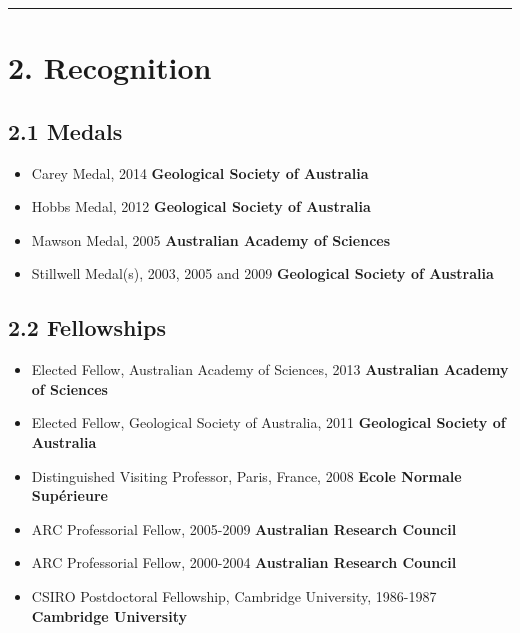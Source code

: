 \documentclass[
]{article}
\providecommand{\tightlist}{%
  \setlength{\itemsep}{0pt}\setlength{\parskip}{0pt}}
\begin{document}
\begin{center}\rule{0.5\linewidth}{0.5pt}\end{center}

\hypertarget{recognition}{%
\section{2. Recognition}\label{recognition}}

\hypertarget{medals}{%
\subsection{2.1 Medals}\label{medals}}

\begin{itemize}
\tightlist
\item
  Carey Medal, 2014 \textbf{Geological Society of Australia}\\
\item
  Hobbs Medal, 2012 \textbf{Geological Society of Australia}\\
\item
  Mawson Medal, 2005 \textbf{Australian Academy of Sciences}
\item
  Stillwell Medal(s), 2003, 2005 and 2009 \textbf{Geological Society of
  Australia}
\end{itemize}

\hypertarget{fellowships}{%
\subsection{2.2 Fellowships}\label{fellowships}}

\begin{itemize}
\tightlist
\item
  Elected Fellow, Australian Academy of Sciences, 2013
  \textbf{Australian Academy of Sciences}
\item
  Elected Fellow, Geological Society of Australia, 2011
  \textbf{Geological Society of Australia}
\item
  Distinguished Visiting Professor, Paris, France, 2008 \textbf{Ecole
  Normale Supérieure}
\item
  ARC Professorial Fellow, 2005-2009 \textbf{Australian Research
  Council}
\item
  ARC Professorial Fellow, 2000-2004 \textbf{Australian Research
  Council}
\item
  CSIRO Postdoctoral Fellowship, Cambridge University, 1986-1987
  \textbf{Cambridge University}
\end{itemize}
\end{document}
